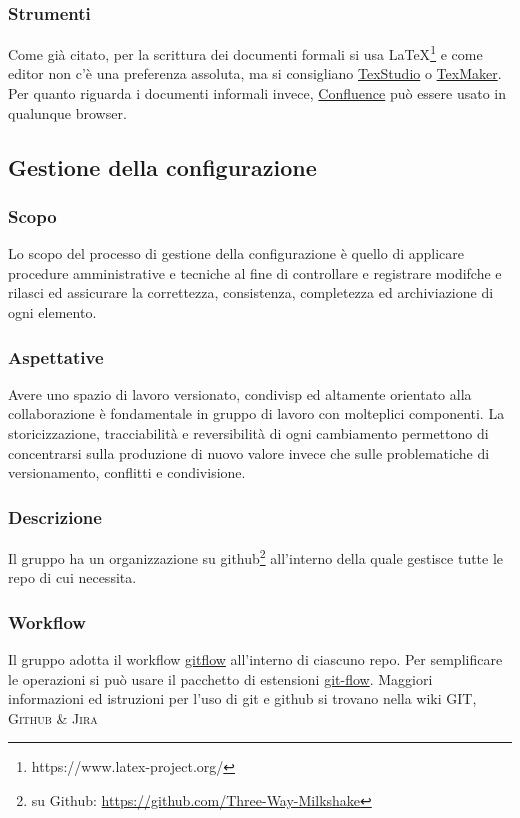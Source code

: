         \subsubsection{Strumenti}
            Come già citato, per la scrittura dei documenti formali si usa \LaTeX\footnote{https://www.latex-project.org/} e come editor non c'è una preferenza assoluta, ma si consigliano \href{http://www.texstudio.org/}{TexStudio} o \href{https://www.xm1math.net/texmaker/}{TexMaker}. Per quanto riguarda i documenti informali invece, \href{https://www.atlassian.com/software/confluence}{Confluence} può essere usato in qualunque browser.


\subsection{Gestione della configurazione}
    \subsubsection{Scopo}
        Lo scopo del processo di gestione della configurazione è quello di applicare procedure amministrative e tecniche al fine di controllare e registrare modifche e rilasci ed assicurare la correttezza, consistenza, completezza ed archiviazione di ogni elemento.
    \subsubsection{Aspettative}
        Avere uno spazio di lavoro versionato, condivisp ed altamente orientato alla collaborazione è fondamentale in gruppo di lavoro con molteplici componenti. La storicizzazione, tracciabilità e reversibilità di ogni cambiamento permettono di concentrarsi sulla produzione di nuovo valore invece che sulle problematiche di versionamento, conflitti e condivisione.
    \subsubsection{Descrizione}
        Il gruppo \group ha un organizzazione su github\footnote{\group su Github: \url{https://github.com/Three-Way-Milkshake}} all'interno della quale gestisce tutte le repo di cui necessita.
    \subsubsection{Workflow}
        Il gruppo adotta il workflow \href{https://www.atlassian.com/git/tutorials/comparing-workflows/gitflow-workflow}{gitflow} all'interno di ciascuno repo. Per semplificare le operazioni si può usare il pacchetto di estensioni \href{http://danielkummer.github.io/git-flow-cheatsheet/}{git-flow}. Maggiori informazioni ed istruzioni per l'uso di git e github si trovano nella wiki \textsc{GIT, Github \& Jira}

